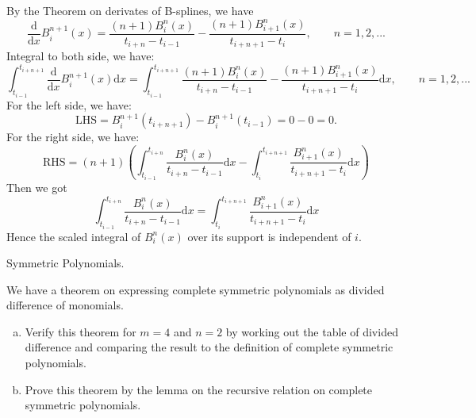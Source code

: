 \documentclass[11pt]{elegantbook}
\begin{document}
\begin{solution}
  By the Theorem on derivates of B-splines, we have
  \begin{equation*}
    \frac{\text{d}}{\text{d}x}B_i^{n+1}(x)=\frac{(n+1)B_i^{n}(x)}{t_{i+n}-t_{i-1}}-\frac{(n+1)B_{i+1}^{n}(x)}{t_{i+n+1}-t_i} ,\qquad n=1,2,...
  \end{equation*}
  Integral to both side, we have:
  \begin{equation*}
    \int_{t_{i-1}}^{t_{i+n+1}}\frac{\text{d}}{\text{d}x}B_i^{n+1}(x) \text{d}x=\int_{t_{i-1}}^{t_{i+n+1}}\frac{(n+1)B_i^{n}(x)}{t_{i+n}-t_{i-1}}-\frac{(n+1)B_{i+1}^{n}(x)}{t_{i+n+1}-t_i}\text{d} x,\qquad n=1,2,...
  \end{equation*}
  For the left side, we have:
  \begin{equation*}
    \text{LHS}=B_i^{n+1}(t_{i+n+1})-B_i^{n+1}(t_{i-1})=0-0=0.
  \end{equation*}
  For the right side, we have:
  \begin{equation*}
    \text{RHS}=(n+1)\left(\int_{t_{i-1}}^{t_{i+n}}\frac{B_i^{n}(x)}{t_{i+n}-t_{i-1}} \text{d}x-\int_{t_{i}}^{t_{i+n+1}}\frac{B_{i+1}^{n}(x)}{t_{i+n+1}-t_{i}} \text{d}x\right)
  \end{equation*}
  Then we got
  \begin{equation*}
    \int_{t_{i-1}}^{t_{i+n}}\frac{B_i^{n}(x)}{t_{i+n}-t_{i-1}} \text{d}x=\int_{t_{i}}^{t_{i+n+1}}\frac{B_{i+1}^{n}(x)}{t_{i+n+1}-t_{i}} \text{d}x
  \end{equation*}
  Hence the scaled integral of $B_i^n(x)$ over its support is independent of $i$.
\end{solution}

\vspace{1.5em}

\begin{problem}
  Symmetric Polynomials.

  We have a theorem on expressing complete symmetric polynomials as divided difference of monomials.
  \begin{enumerate}[(a)]
    \item Verify this theorem for $m=4$ and $n=2$ by working out the table of divided difference and comparing the result to the definition of complete symmetric polynomials.
    \item Prove this theorem by the lemma on the recursive relation on complete symmetric polynomials.
  \end{enumerate}
\end{problem}
\end{document}
